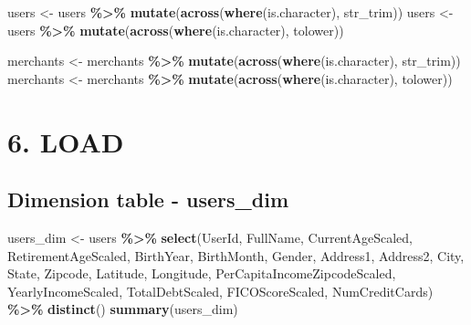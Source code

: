 \documentclass[
]{article}
\newenvironment{Shaded}{\begin{snugshade}}{\end{snugshade}}
\newcommand{\FunctionTok}[1]{\textcolor[rgb]{0.13,0.29,0.53}{\textbf{#1}}}
\newcommand{\NormalTok}[1]{#1}
\newcommand{\OtherTok}[1]{\textcolor[rgb]{0.56,0.35,0.01}{#1}}
\newcommand{\SpecialCharTok}[1]{\textcolor[rgb]{0.81,0.36,0.00}{\textbf{#1}}}
\begin{document}
\begin{Shaded}
\begin{Highlighting}[]
\NormalTok{users }\OtherTok{\textless{}{-}}\NormalTok{ users }\SpecialCharTok{\%\textgreater{}\%}  \FunctionTok{mutate}\NormalTok{(}\FunctionTok{across}\NormalTok{(}\FunctionTok{where}\NormalTok{(is.character), str\_trim))}
\NormalTok{users }\OtherTok{\textless{}{-}}\NormalTok{ users }\SpecialCharTok{\%\textgreater{}\%}  \FunctionTok{mutate}\NormalTok{(}\FunctionTok{across}\NormalTok{(}\FunctionTok{where}\NormalTok{(is.character), tolower))  }

\NormalTok{merchants }\OtherTok{\textless{}{-}}\NormalTok{ merchants }\SpecialCharTok{\%\textgreater{}\%}  \FunctionTok{mutate}\NormalTok{(}\FunctionTok{across}\NormalTok{(}\FunctionTok{where}\NormalTok{(is.character), str\_trim))}
\NormalTok{merchants }\OtherTok{\textless{}{-}}\NormalTok{ merchants }\SpecialCharTok{\%\textgreater{}\%}  \FunctionTok{mutate}\NormalTok{(}\FunctionTok{across}\NormalTok{(}\FunctionTok{where}\NormalTok{(is.character), tolower))  }
\end{Highlighting}
\end{Shaded}

\section{6. LOAD}\label{load}

\subsection{Dimension table -
users\_dim}\label{dimension-table---users_dim}

\begin{Shaded}
\begin{Highlighting}[]
\NormalTok{users\_dim }\OtherTok{\textless{}{-}}\NormalTok{ users }\SpecialCharTok{\%\textgreater{}\%} \FunctionTok{select}\NormalTok{(UserId, FullName, CurrentAgeScaled, RetirementAgeScaled, }
\NormalTok{                              BirthYear, BirthMonth, Gender, Address1, Address2, }
\NormalTok{                              City, State, Zipcode, Latitude, Longitude, }
\NormalTok{                              PerCapitaIncomeZipcodeScaled, YearlyIncomeScaled, TotalDebtScaled, }
\NormalTok{                              FICOScoreScaled, NumCreditCards) }\SpecialCharTok{\%\textgreater{}\%} \FunctionTok{distinct}\NormalTok{()}
\FunctionTok{summary}\NormalTok{(users\_dim)}
\end{Highlighting}
\end{Shaded}
\end{document}
